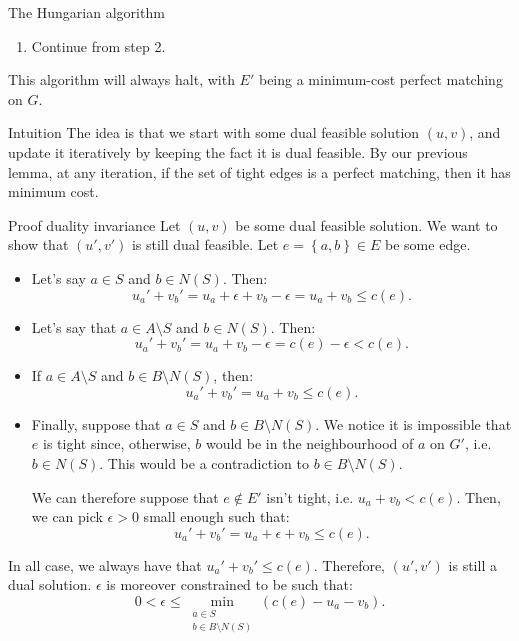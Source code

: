 \documentclass[a4paper]{article}
\begin{document}
\begin{parag}{The Hungarian algorithm}
\begin{enumerate}
        \item Continue from step 2.
    \end{enumerate}

    This algorithm will always halt, with $E'$ being a minimum-cost perfect matching on $G$.

    \begin{subparag}{Intuition}
        The idea is that we start with some dual feasible solution $\left(u, v\right)$, and update it iteratively by keeping the fact it is dual feasible. By our previous lemma, at any iteration, if the set of tight edges is a perfect matching, then it has minimum cost.
    \end{subparag}

    \begin{subparag}{Proof duality invariance}
        Let $\left(u, v\right)$ be some dual feasible solution. We want to show that $\left(u', v'\right)$ is still dual feasible. Let $e = \left\{a, b\right\} \in E$ be some edge.
        \begin{itemize}
            \item Let's say $a \in S$ and $b \in N\left(S\right)$. Then: 
            \[u_a' + v_b' = u_a + \epsilon + v_b - \epsilon = u_a + v_b \leq c\left(e\right).\]
            \item Let's say that $a \in A \setminus S$ and $b \in N\left(S\right)$. Then:
            \[u_a' + v_b' = u_a + v_b - \epsilon = c\left(e\right) - \epsilon < c\left(e\right).\]
            \item If $a \in A \setminus S$ and $b \in B \setminus N\left(S\right)$, then: 
            \[u_a' + v_b' = u_a + v_b \leq c\left(e\right).\]
            \item Finally, suppose that $a \in S$ and $b \in B \setminus N\left(S\right)$. We notice it is impossible that $e$ is tight since, otherwise, $b$ would be in the neighbourhood of $a$ on $G'$, i.e. $b \in N\left(S\right)$. This would be a contradiction to $b \in B \setminus N\left(S\right)$.

                We can therefore suppose that $e \not\in E'$ isn't tight, i.e. $u_a + v_b < c\left(e\right)$. Then, we can pick $\epsilon > 0$ small enough such that: 
            \[u_a' + v_b' = u_a + \epsilon + v_b \leq c\left(e\right).\]
        \end{itemize}

        In all case, we always have that $u_a' + v_b' \leq c\left(e\right)$. Therefore, $\left(u', v'\right)$ is still a dual solution. $\epsilon$ is moreover constrained to be such that: 
        \[0 < \epsilon \leq \min_{\substack{a \in S \\ b \in B \setminus N\left(S\right)}} \left(c\left(e\right) - u_a - v_b\right).\]
    \end{subparag}


\end{parag}
\end{document}
